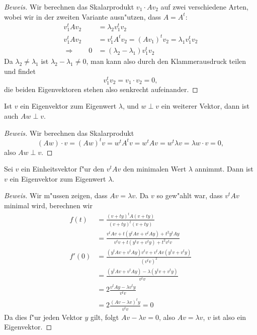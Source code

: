\begin{proof}[Beweis]
Wir berechnen das Skalarprodukt $v_1\cdot Av_2$ auf zwei verschiedene
Arten, wobei wir in der zweiten Variante ausn"utzen, dass $A=A^t$:
\begin{align*}
v_1^tAv_2&=\lambda_2v_1^tv_2
\\
v_1^tAv_2&=v_1^tA^tv_2=(Av_1)^tv_2=\lambda_1v_1^tv_2
\\
\Rightarrow
\qquad
0&=(\lambda_2-\lambda_1)v_1^tv_2
\end{align*}
Da $\lambda_2\ne\lambda_1$ ist $\lambda_2-\lambda_1\ne 0$, man kann
also durch den Klammerausdruck teilen und findet
\[
v_1^tv_2=v_1\cdot v_2=0,
\]
die beiden Eigenvektoren stehen also senkrecht aufeinander.
\end{proof}

\begin{hilfssatz}
\label{ev-ortho}
Ist $v$ ein Eigenvektor zum Eigenwert $\lambda$, und $w\perp v$ ein weiterer
Vektor, dann ist auch $Aw\perp v$.
\end{hilfssatz}

\begin{proof}[Beweis]
Wir berechnen das Skalarprodukt
\[
(Aw)\cdot v=(Aw)^t v=w^tA^tv=w^tAv=w^t\lambda v=\lambda w\cdot v=0,
\]
also $Aw\perp v$.
\end{proof}

\begin{hilfssatz}
\label{ev-existenz}
Sei $v$ ein Einheitsvektor f"ur den $v^tAv$ den minimalen Wert $\lambda$ annimmt.
Dann ist $v$ ein Eigenvektor zum Eigenwert $\lambda$.
\end{hilfssatz}

\begin{proof}[Beweis]
Wir m"ussen zeigen, dass $Av=\lambda v$.
Da $v$ so gew"ahlt war, dass $v^tAv$ minimal wird, berechnen wir 
\begin{align*}
f(t)&=\frac{(v+ty)^tA(v+ty)}{(v+ty)^t(v+ty)}
\\
&=
\frac{v^tAv+t(y^tAv+v^tAy)+t^2y^tAy}{v^tv+t(y^tv+v^ty)+t^2v^tv}
\\
f'(0)
&=
\frac{ (y^tAv+v^tAy)v^tv + v^tAv(y^tv+v^ty) }{ (v^tv)^2 }
\\
&=
\frac{ (y^tAv+v^tAy) - \lambda (y^tv+v^ty) }{ v^tv }
\\
&=
2\frac{ v^tAy - \lambda v^ty }{ v^tv }
\\
&=
2\frac{ (Av - \lambda v)^ty }{ v^tv }=0
\end{align*}
Da dies f"ur jeden Vektor $y$ gilt, folgt $Av-\lambda v=0$, also
$Av=\lambda v$, $v$ ist also ein Eigenvektor.
\end{proof}

